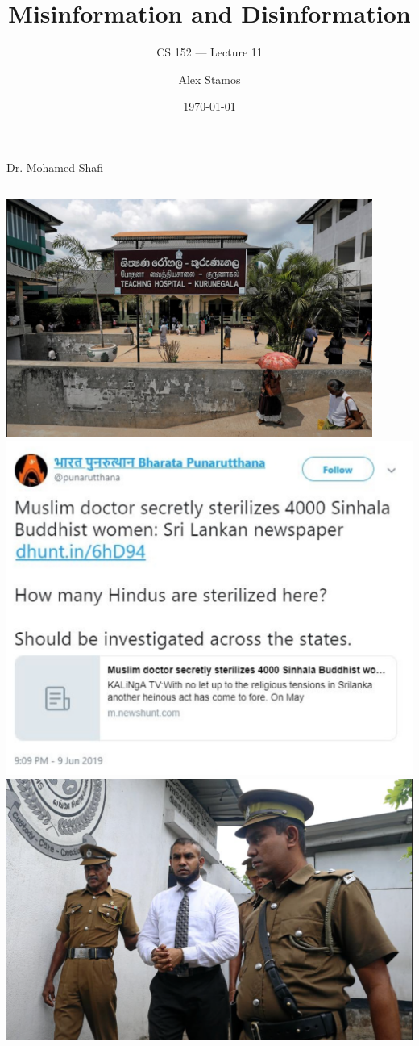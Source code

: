 \documentclass[nobackground,dvipsnames,table,aspectratio=169]{beamer}
\title{Misinformation and Disinformation}
\subtitle{CS 152 --- Lecture 11}
\author[A. Stamos]{Alex Stamos}
\institute[Stanford University]{Stanford Cyber Policy Center}
\date[2022]{\today}
\begin{document}
\begin{frame}
    \titlepage
\end{frame}

\begin{frame}{Dr. Mohamed Shafi}
    \begin{columns}
            \includegraphics[width=0.9\textwidth]{dr-shafi-1}
            \includegraphics[width=\textwidth]{dr-shafi-2}
            \includegraphics[width=\textwidth]{dr-shafi-3}
    \end{columns}
\end{frame}
\end{document}
